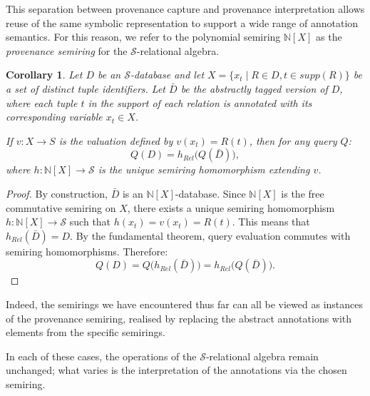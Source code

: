 \documentclass[oneside, 11pt]{amsbook}
\theoremstyle{plain}
\newtheorem{cor}[thm]{Corollary}
\theoremstyle{definition}
\theoremstyle{remark}
\begin{document}
This separation between provenance capture and provenance interpretation allows reuse of the same symbolic representation to support a wide range of annotation semantics. For this reason, we refer to the polynomial semiring $\mathbb{N}[X]$ as the \emph{provenance semiring} for the $\mathcal{S}$-relational algebra.

\begin{cor}
    \label{cor:provenancesemiring}
    Let $D$ be an $\mathcal{S}$-database and let $X = \{x_t \mid R \in D, t \in supp(R)\}$ be a set of distinct tuple identifiers. Let $\bar{D}$ be the abstractly tagged version of $D$, where each tuple $t$ in the support of each relation is annotated with its corresponding variable $x_t \in X$.

    If $v : X \to S$ is the valuation defined by $v(x_t) = R(t)$, then for any query $Q$:
    \[
        Q(D) = h_{Rel}\bigl(Q(\bar{D})\bigr),
    \]
    where $h : \mathbb{N}[X] \to \mathcal{S}$ is the unique semiring homomorphism extending $v$.
\end{cor}
\begin{proof}
    By construction, $\bar{D}$ is an $\mathbb{N}[X]$-database. Since $\mathbb{N}[X]$ is the free commutative semiring on $X$, there exists a unique semiring homomorphism $h : \mathbb{N}[X] \to \mathcal{S}$ such that $h(x_t) = v(x_t) = R(t)$. This means that $h_{Rel}(\bar{D}) = D$. By the fundamental theorem, query evaluation commutes with semiring homomorphisms. Therefore:
    \[
        Q(D) = Q\bigl(h_{Rel}(\bar{D})\bigr) = h_{Rel}\bigl(Q(\bar{D})\bigr).
    \]
\end{proof}

Indeed, the semirings we have encountered thus far can all be viewed as instances of the provenance semiring, realised by replacing the abstract annotations with elements from the specific semirings.

In each of these cases, the operations of the $\mathcal{S}$-relational algebra remain unchanged; what varies is the interpretation of the annotations via the chosen semiring.
\end{document}
